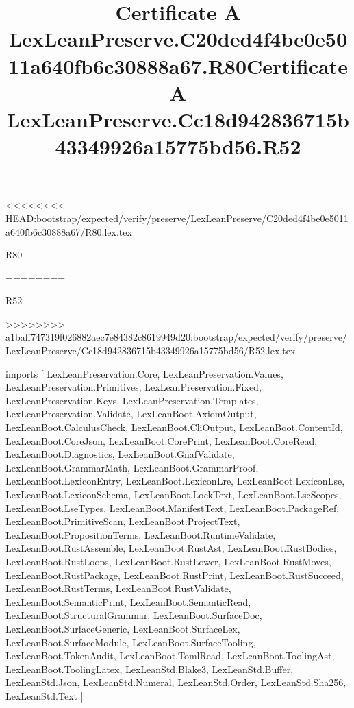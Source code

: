 <<<<<<<< HEAD:bootstrap/expected/verify/preserve/LexLeanPreserve/C20ded4f4be0e5011a640fb6c30888a67/R80.lex.tex
\begin{lexlean}{R80}
\title{Certificate A LexLeanPreserve.C20ded4f4be0e5011a640fb6c30888a67.R80}
========
\begin{lexlean}{R52}
\title{Certificate A LexLeanPreserve.Cc18d942836715b43349926a15775bd56.R52}
>>>>>>>> a1baff747319f026882aec7e84382c8619949d20:bootstrap/expected/verify/preserve/LexLeanPreserve/Cc18d942836715b43349926a15775bd56/R52.lex.tex
\begin{coremodule}
imports [
  LexLeanPreservation.Core,
  LexLeanPreservation.Values,
  LexLeanPreservation.Primitives,
  LexLeanPreservation.Fixed,
  LexLeanPreservation.Keys,
  LexLeanPreservation.Templates,
  LexLeanPreservation.Validate,
  LexLeanBoot.AxiomOutput,
  LexLeanBoot.CalculusCheck,
  LexLeanBoot.CliOutput,
  LexLeanBoot.ContentId,
  LexLeanBoot.CoreJson,
  LexLeanBoot.CorePrint,
  LexLeanBoot.CoreRead,
  LexLeanBoot.Diagnostics,
  LexLeanBoot.GnafValidate,
  LexLeanBoot.GrammarMath,
  LexLeanBoot.GrammarProof,
  LexLeanBoot.LexiconEntry,
  LexLeanBoot.LexiconLre,
  LexLeanBoot.LexiconLse,
  LexLeanBoot.LexiconSchema,
  LexLeanBoot.LockText,
  LexLeanBoot.LseScopes,
  LexLeanBoot.LseTypes,
  LexLeanBoot.ManifestText,
  LexLeanBoot.PackageRef,
  LexLeanBoot.PrimitiveScan,
  LexLeanBoot.ProjectText,
  LexLeanBoot.PropositionTerms,
  LexLeanBoot.RuntimeValidate,
  LexLeanBoot.RustAssemble,
  LexLeanBoot.RustAst,
  LexLeanBoot.RustBodies,
  LexLeanBoot.RustLoops,
  LexLeanBoot.RustLower,
  LexLeanBoot.RustMoves,
  LexLeanBoot.RustPackage,
  LexLeanBoot.RustPrint,
  LexLeanBoot.RustSucceed,
  LexLeanBoot.RustTerms,
  LexLeanBoot.RustValidate,
  LexLeanBoot.SemanticPrint,
  LexLeanBoot.SemanticRead,
  LexLeanBoot.StructuralGrammar,
  LexLeanBoot.SurfaceDoc,
  LexLeanBoot.SurfaceGeneric,
  LexLeanBoot.SurfaceLex,
  LexLeanBoot.SurfaceModule,
  LexLeanBoot.SurfaceTooling,
  LexLeanBoot.TokenAudit,
  LexLeanBoot.TomlRead,
  LexLeanBoot.ToolingAst,
  LexLeanBoot.ToolingLatex,
  LexLeanStd.Blake3,
  LexLeanStd.Buffer,
  LexLeanStd.Json,
  LexLeanStd.Numeral,
  LexLeanStd.Order,
  LexLeanStd.Sha256,
  LexLeanStd.Text
]


\end{coremodule}
\end{lexlean}
\end{lexlean}

